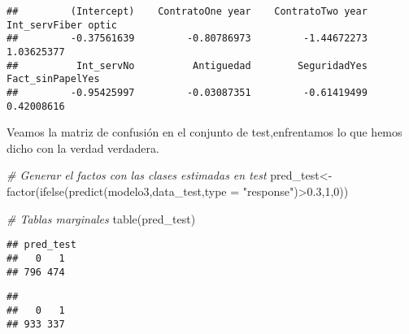 \documentclass[
]{article}
\newenvironment{Shaded}{\begin{snugshade}}{\end{snugshade}}
\newcommand{\AttributeTok}[1]{\textcolor[rgb]{0.77,0.63,0.00}{#1}}
\newcommand{\CommentTok}[1]{\textcolor[rgb]{0.56,0.35,0.01}{\textit{#1}}}
\newcommand{\DecValTok}[1]{\textcolor[rgb]{0.00,0.00,0.81}{#1}}
\newcommand{\FloatTok}[1]{\textcolor[rgb]{0.00,0.00,0.81}{#1}}
\newcommand{\FunctionTok}[1]{\textcolor[rgb]{0.00,0.00,0.00}{#1}}
\newcommand{\NormalTok}[1]{#1}
\newcommand{\OtherTok}[1]{\textcolor[rgb]{0.56,0.35,0.01}{#1}}
\newcommand{\SpecialCharTok}[1]{\textcolor[rgb]{0.00,0.00,0.00}{#1}}
\newcommand{\StringTok}[1]{\textcolor[rgb]{0.31,0.60,0.02}{#1}}
\begin{document}
\begin{verbatim}
##         (Intercept)    ContratoOne year    ContratoTwo year Int_servFiber optic 
##         -0.37561639         -0.80786973         -1.44672273          1.03625377 
##          Int_servNo          Antiguedad        SeguridadYes    Fact_sinPapelYes 
##         -0.95425997         -0.03087351         -0.61419499          0.42008616
\end{verbatim}

Veamos la matriz de confusión en el conjunto de test,enfrentamos lo que
hemos dicho con la verdad verdadera.

\begin{Shaded}
\begin{Highlighting}[]
\CommentTok{\# Generar el factos con las clases estimadas en test}
\NormalTok{pred\_test}\OtherTok{\textless{}{-}}\FunctionTok{factor}\NormalTok{(}\FunctionTok{ifelse}\NormalTok{(}\FunctionTok{predict}\NormalTok{(modelo3,data\_test,}\AttributeTok{type =} \StringTok{"response"}\NormalTok{)}\SpecialCharTok{\textgreater{}}\FloatTok{0.3}\NormalTok{,}\DecValTok{1}\NormalTok{,}\DecValTok{0}\NormalTok{))}

\CommentTok{\# Tablas marginales}
\FunctionTok{table}\NormalTok{(pred\_test)}
\end{Highlighting}
\end{Shaded}

\begin{verbatim}
## pred_test
##   0   1 
## 796 474
\end{verbatim}

\begin{Shaded}
\end{Shaded}

\begin{verbatim}
## 
##   0   1 
## 933 337
\end{verbatim}

\begin{Shaded}
\end{Shaded}
\end{document}

